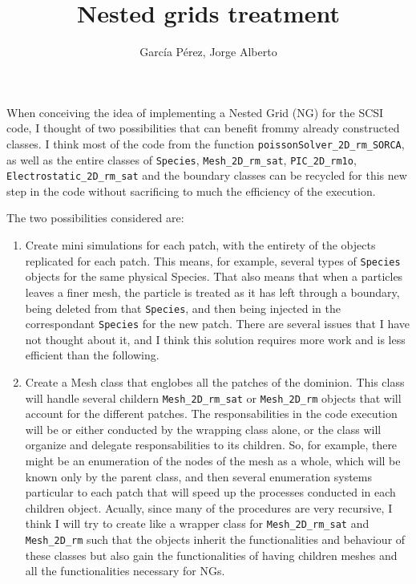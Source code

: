 \documentclass[reprint,aps]{revtex4-1}
\begin{document}
\title{Nested grids treatment}

\author{García Pérez, Jorge Alberto} 


\maketitle

When conceiving the idea of implementing a Nested Grid (NG) for the SCSI code, I thought of two possibilities that can benefit frommy already constructed classes. I think most of the code from the function \texttt{poissonSolver\_2D\_rm\_SORCA}, as well as the entire classes of \texttt{Species}, \texttt{Mesh\_2D\_rm\_sat}, \texttt{PIC\_2D\_rm1o}, \texttt{Electrostatic\_2D\_rm\_sat} and the boundary classes can be recycled for this new step in the code without sacrificing to much the efficiency of the execution.

The two possibilities considered are:

\begin{enumerate}

\item Create mini simulations for each patch, with the entirety of the objects replicated for each patch. This means, for example, several types of \texttt{Species} objects for the same physical Species. That also means that when a particles leaves a finer mesh, the particle is treated as it has left through a boundary, being deleted from that \texttt{Species}, and then being injected in the correspondant \texttt{Species} for the new patch. There are several issues that I have not thought about it, and I think this solution requires more work and is less efficient than the following.
\item Create a Mesh class that englobes all the patches of the dominion. This class will handle several childern \texttt{Mesh\_2D\_rm\_sat} or \texttt{Mesh\_2D\_rm} objects that will account for the different patches. The responsabilities in the code execution will be or either conducted by the wrapping class alone, or the class will organize and delegate responsabilities to its children. So, for example, there might be an enumeration of the nodes of the mesh as a whole, which will be known only by the parent class, and then several enumeration systems particular to each patch that will speed up the processes conducted in each children object. Acually, since many of the procedures are very recursive, I think I will try to create like a wrapper class for \texttt{Mesh\_2D\_rm\_sat} and \texttt{Mesh\_2D\_rm} such that the objects inherit the functionalities and behaviour of these classes but also gain the functionalities of having children meshes and all the functionalities necessary for NGs.

\end{enumerate}
\end{document}
